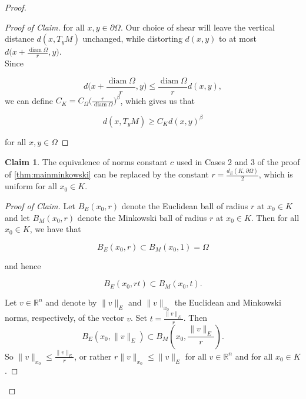 \documentclass[letterpaper, 11pt, reqno]{amsart}
\DeclareMathOperator{\diamop}{diam}
\newcommand\R{{\mathbb R}}
\theoremstyle{definition}
\newtheorem{claim}[thm]{Claim}
\begin{document}
\begin{proof}
\begin{proof}[Proof of Claim]
    for all $x, y \in \partial\Omega$. Our choice of shear will leave the vertical distance $d(x,T_yM)$ unchanged, while distorting $d(x,y)$ to at most $d\big(x + \frac{\diamop \Omega}{r},y\big)$.\\
    Since 
    
    \begin{equation}
     d\bigg(x + \frac{\diamop \Omega}{r},y\bigg) \leq \frac{\diamop \Omega}{r} d(x,y),   
    \end{equation}
     we can define $C_K = C_\Omega\big(\frac{r}{\diamop \Omega}\big)^\beta$, which gives us that

     \begin{equation}%
    d(x,T_yM) \geq C_Kd(x,y)^\beta
\end{equation}

    for all $x,y\in \Omega$

    \end{proof}

    \begin{claim}\label{uniformc}
      The equivalence of norms constant $c$ used in Cases 2 and 3 of the proof of \ref{thm:mainminkowski} can be replaced by the constant $r = \frac{d_E(K, \partial \Omega)}{2}$, which is uniform for all $x_0 \in K$.
    \end{claim}

    \begin{proof}[Proof of Claim]
      Let $B_E(x_0,r)$ denote the Euclidean ball of radius $r$ at $x_0 \in K$ and let $B_M(x_0,r)$ denote the Minkowski ball of radius $r$ at $x_0 \in K$. Then for all $x_0 \in K$, we have that

      \begin{equation}
       B_E(x_0,r) \subset B_M(x_0,1) = \Omega
      \end{equation}

      and hence

    \begin{equation}
       B_E(x_0,rt) \subset B_M(x_0,t).
      \end{equation}

     Let $v \in \R^n$ and denote by $\|v\|_E$ and $\|v\|_{x_0}$ the Euclidean and Minkowski norms, respectively, of the vector $v$. Set $t = \frac{\|v\|_E}{r}$. Then
    \begin{equation}
       B_E(x_0,\|v\|_E) \subset B_M(x_0,\frac{\|v\|_E}{r}).
      \end{equation}
      So $\|v\|_{x_0} \leq \frac{\|v\|_E}{r}$, or rather $r\|v\|_{x_0} \leq \|v\|_E$ for all $v \in \R^n$ and for all $x_0 \in K$.
    \end{proof}


\end{proof}
\end{document}
